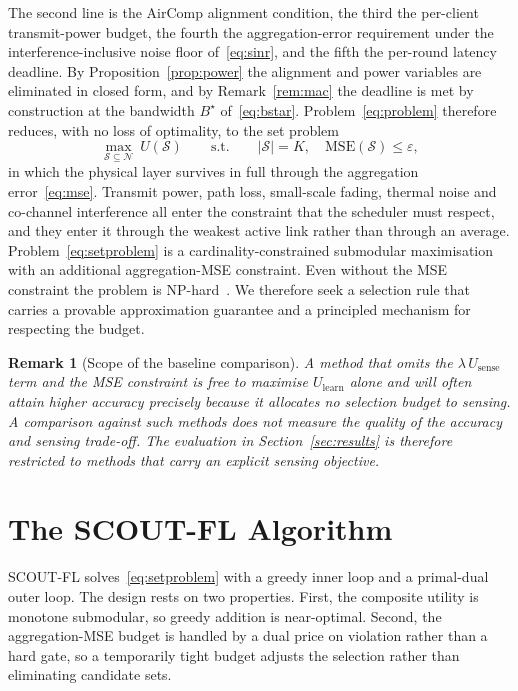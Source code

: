 \documentclass[lettersize,journal]{IEEEtran}
\newtheorem{remark}{Remark}
\newcommand{\calS}{\mathcal{S}}
\newcommand{\calN}{\mathcal{N}}
\newcommand{\scout}{SCOUT-FL}
\begin{document}
The second line is the AirComp alignment condition, the third the per-client transmit-power budget, the fourth the aggregation-error requirement under the interference-inclusive noise floor of~\eqref{eq:sinr}, and the fifth the per-round latency deadline. By Proposition~\ref{prop:power} the alignment and power variables are eliminated in closed form, and by Remark~\ref{rem:mac} the deadline is met by construction at the bandwidth $B^{\star}$ of~\eqref{eq:bstar}. Problem~\eqref{eq:problem} therefore reduces, with no loss of optimality, to the set problem
\begin{equation}
\max_{\calS\subseteq\calN}\ U(\calS)
\qquad\text{s.t.}\qquad
|\calS|=K,\quad \mathrm{MSE}(\calS)\le\varepsilon,
\label{eq:setproblem}
\end{equation}
in which the physical layer survives in full through the aggregation error~\eqref{eq:mse}. Transmit power, path loss, small-scale fading, thermal noise and co-channel interference all enter the constraint that the scheduler must respect, and they enter it through the weakest active link rather than through an average. Problem~\eqref{eq:setproblem} is a cardinality-constrained submodular maximisation with an additional aggregation-MSE constraint. Even without the MSE constraint the problem is NP-hard~\cite{nemhauser1978}. We therefore seek a selection rule that carries a provable approximation guarantee and a principled mechanism for respecting the budget.

\begin{remark}[Scope of the baseline comparison]
A method that omits the $\lambda\,U_{\mathrm{sense}}$ term and the MSE constraint is free to maximise $U_{\mathrm{learn}}$ alone and will often attain higher accuracy precisely because it allocates no selection budget to sensing. A comparison against such methods does not measure the quality of the accuracy and sensing trade-off. The evaluation in Section~\ref{sec:results} is therefore restricted to methods that carry an explicit sensing objective.
\end{remark}

\section{The SCOUT-FL Algorithm}\label{sec:algorithm}
\scout{} solves~\eqref{eq:setproblem} with a greedy inner loop and a primal-dual outer loop. The design rests on two properties. First, the composite utility is monotone submodular, so greedy addition is near-optimal. Second, the aggregation-MSE budget is handled by a dual price on violation rather than a hard gate, so a temporarily tight budget adjusts the selection rather than eliminating candidate sets.
\end{document}
